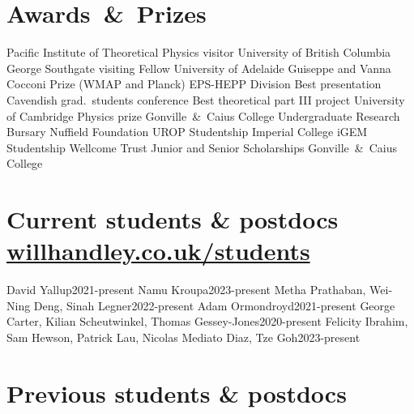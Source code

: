 \documentclass[11pt,a4paper,sans]{moderncv}
\begin{document}
\section{Awards~\&~Prizes}
  {Pacific Institute of Theoretical Physics visitor}         {University of British Columbia}
  {George Southgate visiting Fellow}         {University of Adelaide}
  {Guiseppe and Vanna Cocconi Prize (WMAP and Planck)}         {EPS-HEPP Division}
  {Best presentation}                 {Cavendish grad.\ students conference}
  {Best theoretical part III project} {University of Cambridge} 
\cvitemwithcomment{}            {Physics prize}                     {Gonville~\&~Caius College} 
 {Undergraduate Research Bursary}    {Nuffield Foundation}  
\cvitemwithcomment{}            {UROP Studentship}                  {Imperial College} 
 {iGEM Studentship}                  {Wellcome Trust} 
    {Junior and Senior Scholarships}    {Gonville~\&~Caius College} 

\section{Current students \& postdocs \hfill\href{https://www.willhandley.co.uk/students}{willhandley.co.uk/students}}
  {David Yallup}{2021-present}
 {Namu Kroupa}{2023-present}
\cvitemwithcomment{} {Metha Prathaban, Wei-Ning Deng, Sinah Legner}{2022-present}
\cvitemwithcomment{}  {Adam Ormondroyd}{2021-present}
\cvitemwithcomment{}  {George Carter, Kilian Scheutwinkel, Thomas Gessey-Jones}{2020-present}
  {Felicity Ibrahim, Sam Hewson, Patrick Lau, Nicolas Mediato Diaz, Tze Goh}{2023-present}

\pagebreak
\section{Previous students \& postdocs}
\end{document}
